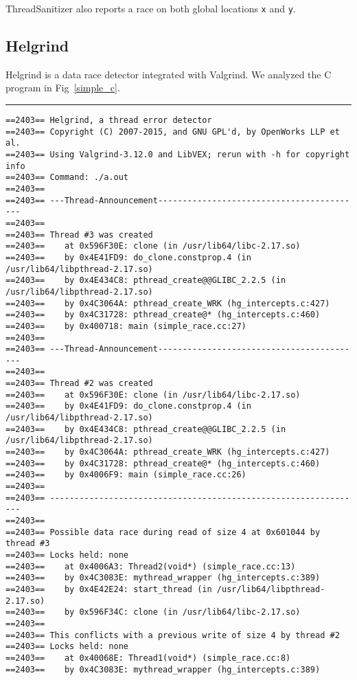 ThreadSanitizer also reports a race on both global locations \texttt{x} and \texttt{y}.

\subsection{Helgrind}

Helgrind is a data race detector integrated with Valgrind.
We analyzed the C program in Fig~\ref{simple_c}.
\vspace{0.5cm}
\hrule
{\small
\begin{verbatim}
==2403== Helgrind, a thread error detector
==2403== Copyright (C) 2007-2015, and GNU GPL'd, by OpenWorks LLP et al.
==2403== Using Valgrind-3.12.0 and LibVEX; rerun with -h for copyright info
==2403== Command: ./a.out
==2403== 
==2403== ---Thread-Announcement------------------------------------------
==2403== 
==2403== Thread #3 was created
==2403==    at 0x596F30E: clone (in /usr/lib64/libc-2.17.so)
==2403==    by 0x4E41FD9: do_clone.constprop.4 (in /usr/lib64/libpthread-2.17.so)
==2403==    by 0x4E434C8: pthread_create@@GLIBC_2.2.5 (in /usr/lib64/libpthread-2.17.so)
==2403==    by 0x4C3064A: pthread_create_WRK (hg_intercepts.c:427)
==2403==    by 0x4C31728: pthread_create@* (hg_intercepts.c:460)
==2403==    by 0x400718: main (simple_race.cc:27)
==2403== 
==2403== ---Thread-Announcement------------------------------------------
==2403== 
==2403== Thread #2 was created
==2403==    at 0x596F30E: clone (in /usr/lib64/libc-2.17.so)
==2403==    by 0x4E41FD9: do_clone.constprop.4 (in /usr/lib64/libpthread-2.17.so)
==2403==    by 0x4E434C8: pthread_create@@GLIBC_2.2.5 (in /usr/lib64/libpthread-2.17.so)
==2403==    by 0x4C3064A: pthread_create_WRK (hg_intercepts.c:427)
==2403==    by 0x4C31728: pthread_create@* (hg_intercepts.c:460)
==2403==    by 0x4006F9: main (simple_race.cc:26)
==2403== 
==2403== ----------------------------------------------------------------
==2403== 
==2403== Possible data race during read of size 4 at 0x601044 by thread #3
==2403== Locks held: none
==2403==    at 0x4006A3: Thread2(void*) (simple_race.cc:13)
==2403==    by 0x4C3083E: mythread_wrapper (hg_intercepts.c:389)
==2403==    by 0x4E42E24: start_thread (in /usr/lib64/libpthread-2.17.so)
==2403==    by 0x596F34C: clone (in /usr/lib64/libc-2.17.so)
==2403== 
==2403== This conflicts with a previous write of size 4 by thread #2
==2403== Locks held: none
==2403==    at 0x40068E: Thread1(void*) (simple_race.cc:8)
==2403==    by 0x4C3083E: mythread_wrapper (hg_intercepts.c:389)

\end{verbatim}}
